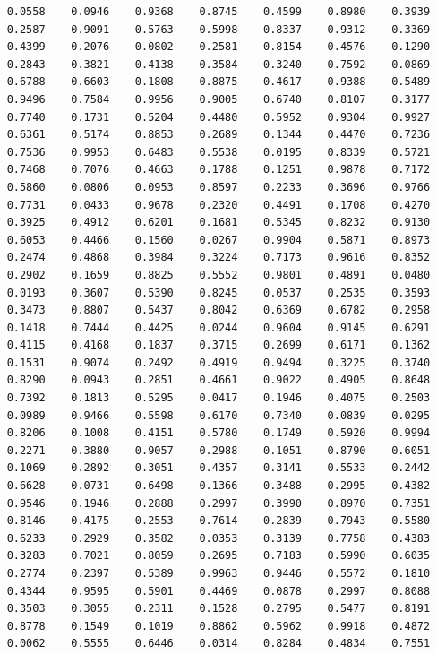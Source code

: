 \documentclass[11pt, oneside]{article}   	%
\begin{document}
\begin{verbatim}
    0.0558    0.0946    0.9368    0.8745    0.4599    0.8980    0.3939
    0.2587    0.9091    0.5763    0.5998    0.8337    0.9312    0.3369
    0.4399    0.2076    0.0802    0.2581    0.8154    0.4576    0.1290
    0.2843    0.3821    0.4138    0.3584    0.3240    0.7592    0.0869
    0.6788    0.6603    0.1808    0.8875    0.4617    0.9388    0.5489
    0.9496    0.7584    0.9956    0.9005    0.6740    0.8107    0.3177
    0.7740    0.1731    0.5204    0.4480    0.5952    0.9304    0.9927
    0.6361    0.5174    0.8853    0.2689    0.1344    0.4470    0.7236
    0.7536    0.9953    0.6483    0.5538    0.0195    0.8339    0.5721
    0.7468    0.7076    0.4663    0.1788    0.1251    0.9878    0.7172
    0.5860    0.0806    0.0953    0.8597    0.2233    0.3696    0.9766
    0.7731    0.0433    0.9678    0.2320    0.4491    0.1708    0.4270
    0.3925    0.4912    0.6201    0.1681    0.5345    0.8232    0.9130
    0.6053    0.4466    0.1560    0.0267    0.9904    0.5871    0.8973
    0.2474    0.4868    0.3984    0.3224    0.7173    0.9616    0.8352
    0.2902    0.1659    0.8825    0.5552    0.9801    0.4891    0.0480
    0.0193    0.3607    0.5390    0.8245    0.0537    0.2535    0.3593
    0.3473    0.8807    0.5437    0.8042    0.6369    0.6782    0.2958
    0.1418    0.7444    0.4425    0.0244    0.9604    0.9145    0.6291
    0.4115    0.4168    0.1837    0.3715    0.2699    0.6171    0.1362
    0.1531    0.9074    0.2492    0.4919    0.9494    0.3225    0.3740
    0.8290    0.0943    0.2851    0.4661    0.9022    0.4905    0.8648
    0.7392    0.1813    0.5295    0.0417    0.1946    0.4075    0.2503
    0.0989    0.9466    0.5598    0.6170    0.7340    0.0839    0.0295
    0.8206    0.1008    0.4151    0.5780    0.1749    0.5920    0.9994
    0.2271    0.3880    0.9057    0.2988    0.1051    0.8790    0.6051
    0.1069    0.2892    0.3051    0.4357    0.3141    0.5533    0.2442
    0.6628    0.0731    0.6498    0.1366    0.3488    0.2995    0.4382
    0.9546    0.1946    0.2888    0.2997    0.3990    0.8970    0.7351
    0.8146    0.4175    0.2553    0.7614    0.2839    0.7943    0.5580
    0.6233    0.2929    0.3582    0.0353    0.3139    0.7758    0.4383
    0.3283    0.7021    0.8059    0.2695    0.7183    0.5990    0.6035
    0.2774    0.2397    0.5389    0.9963    0.9446    0.5572    0.1810
    0.4344    0.9595    0.5901    0.4469    0.0878    0.2997    0.8088
    0.3503    0.3055    0.2311    0.1528    0.2795    0.5477    0.8191
    0.8778    0.1549    0.1019    0.8862    0.5962    0.9918    0.4872
    0.0062    0.5555    0.6446    0.0314    0.8284    0.4834    0.7551

\end{verbatim}
\end{document}
